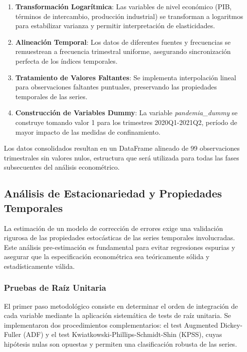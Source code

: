 \documentclass[3p,11pt]{elsarticle}
\begin{document}
\begin{enumerate}
    \item \textbf{Transformación Logarítmica}: Las variables de nivel económico (PIB, términos de intercambio, producción industrial) se transforman a logaritmos para estabilizar varianza y permitir interpretación de elasticidades.
    
    \item \textbf{Alineación Temporal}: Los datos de diferentes fuentes y frecuencias se remuestrean a frecuencia trimestral uniforme, asegurando sincronización perfecta de los índices temporales.
    
    \item \textbf{Tratamiento de Valores Faltantes}: Se implementa interpolación lineal para observaciones faltantes puntuales, preservando las propiedades temporales de las series.
    
    \item \textbf{Construcción de Variables Dummy}: La variable \textit{pandemia\_dummy} se construye tomando valor 1 para los trimestres 2020Q1-2021Q2, período de mayor impacto de las medidas de confinamiento.
\end{enumerate}

Los datos consolidados resultan en un DataFrame alineado de 99 observaciones trimestrales sin valores nulos, estructura que será utilizada para todas las fases subsecuentes del análisis econométrico.

\subsection{Análisis de Estacionariedad y Propiedades Temporales}

La estimación de un modelo de corrección de errores exige una validación rigurosa de las propiedades estocásticas de las series temporales involucradas. Este análisis pre-estimación es fundamental para evitar regresiones espurias y asegurar que la especificación econométrica sea teóricamente sólida y estadísticamente válida.

\subsubsection{Pruebas de Raíz Unitaria}

El primer paso metodológico consiste en determinar el orden de integración de cada variable mediante la aplicación sistemática de tests de raíz unitaria. Se implementaron dos procedimientos complementarios: el test Augmented Dickey-Fuller (ADF) y el test Kwiatkowski-Phillips-Schmidt-Shin (KPSS), cuyas hipótesis nulas son opuestas y permiten una clasificación robusta de las series.
\end{document}
